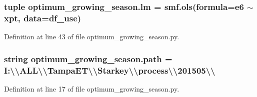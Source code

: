 \subsubsection[{lm}]{\setlength{\rightskip}{0pt plus 5cm}tuple optimum\+\_\+growing\+\_\+season.\+lm = smf.\+ols(formula=\textquotesingle{}e6 $\sim$ xpt\textquotesingle{}, data={\bf df\+\_\+use})}\label{namespaceoptimum__growing__season_a13c3c4032d3b542bded1c71be14555e6}


Definition at line 43 of file optimum\+\_\+growing\+\_\+season.\+py.

\hypertarget{namespaceoptimum__growing__season_a8ff964a02946ca58f934b298b97d02a5}{}
\subsubsection[{path}]{\setlength{\rightskip}{0pt plus 5cm}string optimum\+\_\+growing\+\_\+season.\+path = \textquotesingle{}I\+:\textbackslash{}\textbackslash{}\+A\+L\+L\textbackslash{}\textbackslash{}\+Tampa\+E\+T\textbackslash{}\textbackslash{}\+Starkey\textbackslash{}\textbackslash{}process\textbackslash{}\textbackslash{}201505\textbackslash{}\textbackslash{}\textquotesingle{}}\label{namespaceoptimum__growing__season_a8ff964a02946ca58f934b298b97d02a5}


Definition at line 17 of file optimum\+\_\+growing\+\_\+season.\+py.

